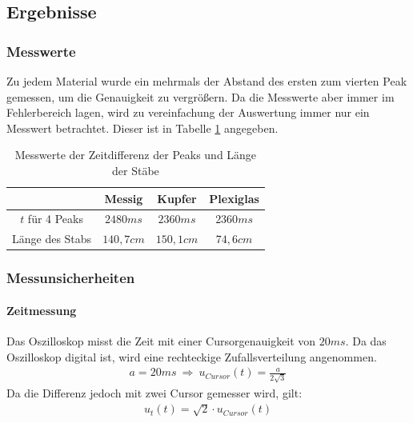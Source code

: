 \documentclass[11pt, a4paper]{article}
\begin{document}
    \subsection{Ergebnisse}
    \subsubsection{Messwerte}
    Zu jedem Material wurde ein mehrmals der Abstand des ersten zum
    vierten Peak gemessen, um die Genauigkeit zu vergrößern. Da die Messwerte aber immer im Fehlerbereich lagen,
    wird zu vereinfachung der Auswertung immer nur ein Messwert betrachtet. Dieser ist in Tabelle \ref{ex:mess1}
    angegeben. 
    \begin{table}[!th]
        \centering
        \begin{tabular}{c | c | c | c}
           & Messig & Kupfer & Plexiglas \\ \hline
            $ t $ für 4 Peaks & $ 2480ms $ & $ 2360ms $ & $ 2360ms $ \\ \hline
            Länge des Stabs & $140,7cm$ & $150,1cm$ & $74,6cm$ \\
        \end{tabular}
        \caption{Messwerte der Zeitdifferenz der Peaks und Länge der  Stäbe}
        \label{ex:mess1}
    \end{table}
    \subsubsection{Messunsicherheiten}
    \paragraph{Zeitmessung}
    Das Oszilloskop misst die Zeit mit einer Cursorgenauigkeit von $ 20ms $. Da das Oszilloskop digital ist, wird
    eine rechteckige Zufallsverteilung angenommen.
    \begin{align}
        a = 20ms \ \Rightarrow \ u_{Cursor}(t) = \frac{a}{2 \sqrt{3}}
    \end{align}
    Da die Differenz jedoch mit zwei Cursor gemesser wird, gilt:
    \begin{align}
        u_{t}(t) = \sqrt{2} \cdot u_{Cursor}(t)
    \end{align}
\end{document}
